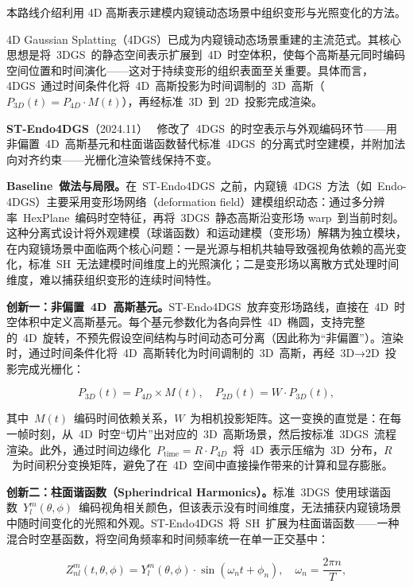 本路线介绍利用 4D 高斯表示建模内窥镜动态场景中组织变形与光照变化的方法。

4D Gaussian Splatting（4DGS）已成为内窥镜动态场景重建的主流范式。其核心思想是将~3DGS~的静态空间表示扩展到~4D~时空体积，使每个高斯基元同时编码空间位置和时间演化——这对于持续变形的组织表面至关重要。具体而言，4DGS~通过时间条件化将~4D~高斯投影为时间调制的~3D~高斯（$P_{3D}(t) = P_{4D} \cdot M(t)$），再经标准~3D~到~2D~投影完成渲染。

\textbf{ST-Endo4DGS}（2024.11）~\cite{2411_01218} 修改了~4DGS~的时空表示与外观编码环节——用非偏置~4D~高斯基元和柱面谐函数替代标准~4DGS~的分离式时空建模，并附加法向对齐约束——光栅化渲染管线保持不变。

\textbf{Baseline~做法与局限。}在~ST-Endo4DGS~之前，内窥镜~4DGS~方法（如~Endo-4DGS）主要采用变形场网络（deformation field）建模组织动态：通过多分辨率~HexPlane~编码时空特征，再将~3DGS~静态高斯沿变形场 warp~到当前时刻。这种分离式设计将外观建模（球谐函数）和运动建模（变形场）解耦为独立模块，在内窥镜场景中面临两个核心问题：一是光源与相机共轴导致强视角依赖的高光变化，标准~SH~无法建模时间维度上的光照演化；二是变形场以离散方式处理时间维度，难以捕获组织变形的连续时间特性。

\textbf{创新一：非偏置~4D~高斯基元。}ST-Endo4DGS~放弃变形场路线，直接在~4D~时空体积中定义高斯基元。每个基元参数化为各向异性~4D~椭圆，支持完整的~4D~旋转，不预先假设空间结构与时间动态可分离（因此称为``非偏置''）。渲染时，通过时间条件化将~4D~高斯转化为时间调制的~3D~高斯，再经~3D→2D~投影完成光栅化：

\begin{equation}
P_{3D}(t) = P_{4D} \times M(t), \quad P_{2D}(t) = W \cdot P_{3D}(t),
\end{equation}

其中~$M(t)$~编码时间依赖关系，$W$~为相机投影矩阵。这一变换的直觉是：在每一帧时刻，从~4D~时空``切片''出对应的~3D~高斯场景，然后按标准~3DGS~流程渲染。此外，通过时间边缘化~$P_{\text{time}} = R \cdot P_{4D}$~将~4D~表示压缩为~3D~分布，$R$~为时间积分变换矩阵，避免了在~4D~空间中直接操作带来的计算和显存膨胀。

\textbf{创新二：柱面谐函数（Spherindrical Harmonics）。}标准~3DGS~使用球谐函数~$Y_l^m(\theta,\phi)$~编码视角相关颜色，但该表示没有时间维度，无法捕获内窥镜场景中随时间变化的光照和外观。ST-Endo4DGS~将~SH~扩展为柱面谐函数——一种混合时空基函数，将空间角频率和时间频率统一在单一正交基中：

\begin{equation}
Z_{nl}^m(t, \theta, \phi) = Y_l^m(\theta, \phi) \cdot \sin(\omega_n t + \phi_n), \quad \omega_n = \frac{2\pi n}{T},
\end{equation}

